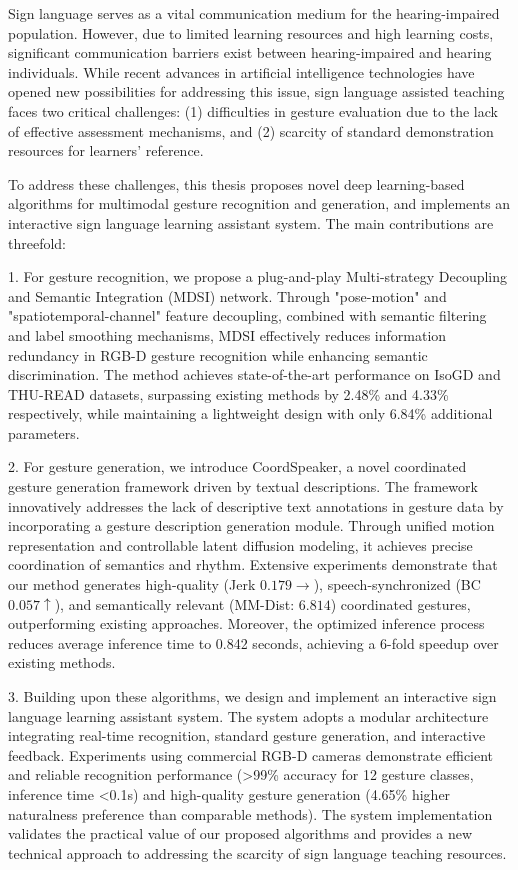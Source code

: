 \begin{abstract*}
Sign language serves as a vital communication medium for the hearing-impaired population. However, due to limited learning resources and high learning costs, significant communication barriers exist between hearing-impaired and hearing individuals. While recent advances in artificial intelligence technologies have opened new possibilities for addressing this issue, sign language assisted teaching faces two critical challenges: (1) difficulties in gesture evaluation due to the lack of effective assessment mechanisms, and (2) scarcity of standard demonstration resources for learners' reference.

To address these challenges, this thesis proposes novel deep learning-based algorithms for multimodal gesture recognition and generation, and implements an interactive sign language learning assistant system. The main contributions are threefold:

1. For gesture recognition, we propose a plug-and-play Multi-strategy Decoupling and Semantic Integration (MDSI) network. Through "pose-motion" and "spatiotemporal-channel" feature decoupling, combined with semantic filtering and label smoothing mechanisms, MDSI effectively reduces information redundancy in RGB-D gesture recognition while enhancing semantic discrimination. The method achieves state-of-the-art performance on IsoGD and THU-READ datasets, surpassing existing methods by 2.48\% and 4.33\% respectively, while maintaining a lightweight design with only 6.84\% additional parameters.

2. For gesture generation, we introduce CoordSpeaker, a novel coordinated gesture generation framework driven by textual descriptions. The framework innovatively addresses the lack of descriptive text annotations in gesture data by incorporating a gesture description generation module. Through unified motion representation and controllable latent diffusion modeling, it achieves precise coordination of semantics and rhythm. Extensive experiments demonstrate that our method generates high-quality (Jerk $0.179\rightarrow$), speech-synchronized (BC $0.057\uparrow$), and semantically relevant (MM-Dist: $6.814$) coordinated gestures, outperforming existing approaches. Moreover, the optimized inference process reduces average inference time to 0.842 seconds, achieving a 6-fold speedup over existing methods.

3. Building upon these algorithms, we design and implement an interactive sign language learning assistant system. The system adopts a modular architecture integrating real-time recognition, standard gesture generation, and interactive feedback. Experiments using commercial RGB-D cameras demonstrate efficient and reliable recognition performance (>99\% accuracy for 12 gesture classes, inference time <0.1s) and high-quality gesture generation (4.65\% higher naturalness preference than comparable methods). The system implementation validates the practical value of our proposed algorithms and provides a new technical approach to addressing the scarcity of sign language teaching resources.

\end{abstract*}
